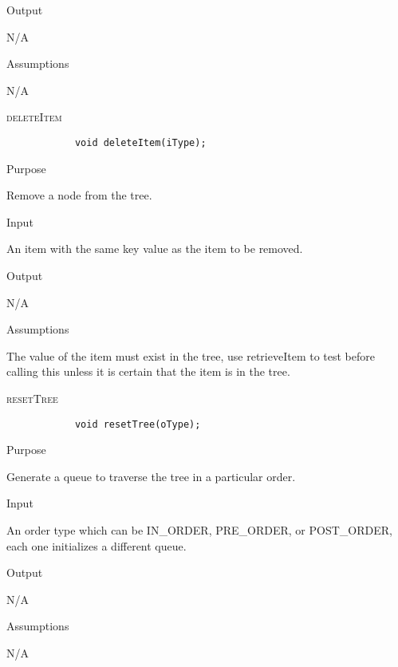 \documentclass[pdftex, 12pt]{article}
\begin{document}
\begin{description}
\begin{description}
			\item{Output}

				N/A

			\item{Assumptions}

				N/A

		\end{description}
	\item{\textsc{deleteItem}}
		\begin{lstlisting}
			void deleteItem(iType);
		\end{lstlisting}
		\begin{description}

			\item{Purpose}

				Remove a node from the tree.

			\item{Input}

				An item with the same key value as the item to be removed.

			\item{Output}

				N/A

			\item{Assumptions}

				The value of the item must exist in the tree, use retrieveItem to test before calling this unless it is
				certain that the item is in the tree.

		\end{description}
	\item{\textsc{resetTree}}
		\begin{lstlisting}
			void resetTree(oType);
		\end{lstlisting}
		\begin{description}

			\item{Purpose}

				Generate a queue to traverse the tree in a particular order.

			\item{Input}

				An order type which can be IN\_ORDER, PRE\_ORDER, or POST\_ORDER, each one initializes a different
				queue.

			\item{Output}

				N/A

			\item{Assumptions}

				N/A


\end{description}
\end{description}
\end{document}
